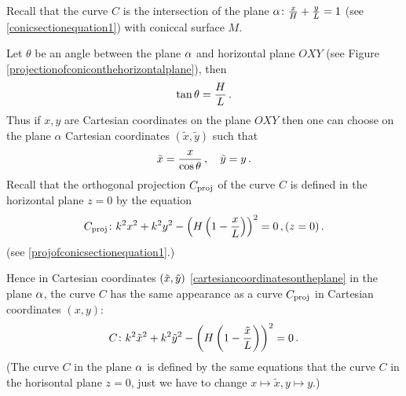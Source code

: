 \documentclass[12pt]{article}
\numberwithin{equation}{section}
\begin{document}
\begin{equation}
\label{projectionofconiconthehorizontalplane}
\end{equation}




Recall that the curve $C$ is the intersection of
the plane $\alpha\colon {x\over H}+{y\over L}=1$
(see \eqref{conicsectionequation1})  with coniccal  surface  $M$.

 Let $\theta$ be an angle between the plane $\alpha$ and horizontal
plane $OXY$ (see Figure \eqref{projectionofconiconthehorizontalplane}),
 then
            $$
      {\rm tan\,}\theta={H\over L}\,.
            $$
Thus if $x,y$ are Cartesian coordinates on the plane
  $OXY$ then one can choose on the plane $\alpha$
Cartesian coordinates $(\tilde x,\tilde y)$ such that 
      \begin{equation}\label{cartesiancoordinatesontheplane}
       \tilde x={x\over\cos\theta}\,,\quad
       \tilde y=y\,.
     \end{equation} 
Recall that the orthogonal projection $C_{\rm proj}$
of the curve $C$ is defined in the horizontal plane $z=0$ by
the equation 
  \begin{equation}\label{projectionofconicsection4}
C_{\rm proj}\colon k^2x^2+k^2y^2-
   \left(H\left(1-{x\over L}\right)\right)^2=0\,, (z=0)\,.
           \end{equation}
(see \eqref{projofconicsectionequation1}.)


Hence in Cartesian coordinates $(\tilde x, \tilde y)$
\eqref{cartesiancoordinatesontheplane} in the plane $\alpha$,
the 
curve $C$ has the same appearance as a curve $C_{\rm proj}$
in Cartesian coordinates $(x,y)$:
                     $$
C\colon k^2{\tilde x}^2+k^2{\tilde y}^2-
   \left(H\left(1-{{\tilde x}\over L}\right)\right)^2=0\,.
           $$
   (The curve $C$ in the plane $\alpha$ is defined
by the same equations that the curve $C$ in the horisontal 
plane $z=0$, just we have to 
change $x\mapsto \tilde x, y\mapsto y$.)
\end{document}
